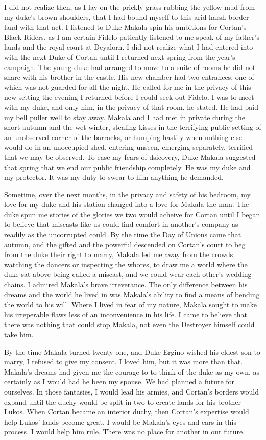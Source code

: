 \documentclass{article}
\begin{document}
I did not realize then, as I lay on the prickly grass rubbing the yellow mud from my duke's brown shoulders, that I had bound myself to this arid harsh border land with that act. I listened to Duke Makala spin his ambitions for Cortan's Black Riders, as I am certain Fidelo patiently listened to me speak of my father's lands and the royal court at Deyalorn. I did not realize what I had entered into with the next Duke of Cortan until I returned next spring from the year's campaign. The young duke had arranged to move to a suite of rooms he did not share with his brother in the castle. His new chamber had two entrances, one of which was not guarded for all the night. He called for me in the privacy of this new setting the evening I returned before I could seek out Fidelo. I was to meet with my duke, and only him, in the privacy of that room, he stated. He had paid my bell puller well to stay away. Makala and I had met in private during the short autumn and the wet winter, stealing kisses in the terrifying public setting of an unobserved corner of the barracks, or humping hastily when nothing else would do in an unoccupied shed, entering unseen, emerging separately, terrified that we may be observed. To ease my fears of dsicovery, Duke Makala suggested that spring that we end our public friendship completely. He was my duke and my protector. It was my duty to swear to him anything he demanded. 

Sometime, over the next months, in the privacy and safety of his bedroom, my love for my duke and his station changed into a love for Makala the man. The duke spun me stories of the glories we two would acheive for Cortan until I began to believe that miscasts like us could find comfort in another's company as readily as the uncorrupted could. By the time the Day of Unions came that autumn, and the gifted and the powerful descended on Cortan's court to beg from the duke their right to marry, Makala led me away from the crowds watching the dancers or inspecting the whores, to draw me a world where the duke sat above being called a miscast, and we could wear each other's wedding chains. I admired Makala's brave irreverance. The only difference between his dreams and the world he lived in was Makala's ability to find a means of bending the world to his will. Where I lived in fear of my nature, Makala sought to make his irreperable flaws less of an inconvenience in his life. I came to believe that there was nothing that could stop Makala, not even the Destroyer himself could take him.

By the time Makala turned twenty one, and Duke Ergino wished his eldest son to marry, I refused to give my consent. I loved him, but it was more than that. Makala's dreams had given me the courage to to think of the duke as my own, as certainly as I would had he been my spouse. We had planned a future for ourselves. In those fantasies, I would lead his armies, and Cortan's borders would expand until the duchy would be split in two to create lands for his brother Lukos. When Cortan became an interior duchy, then Cortan's expertise would help Lukos' lands become great. I would be Makala's eyes and ears in this process. I would help him rule. There was no place for another in our future. 
\end{document}
